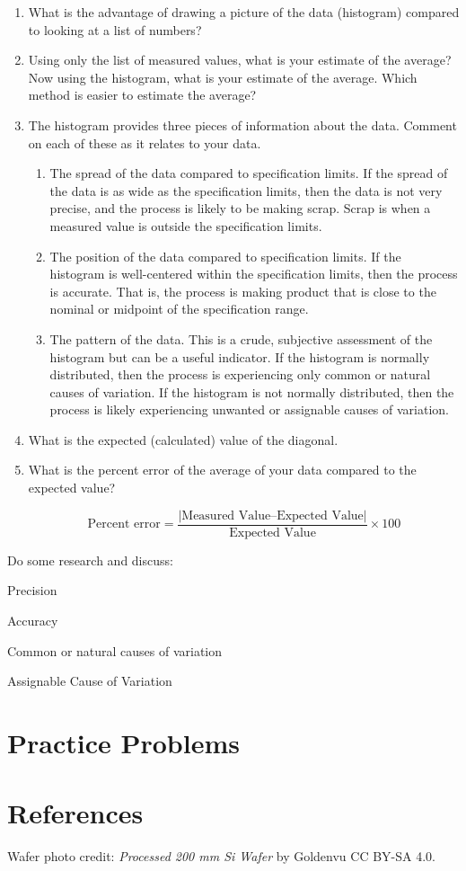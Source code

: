 \documentclass{ximera}
\begin{document}
\begin{enumerate}
\item What is the advantage of drawing a picture of the data (histogram) compared to looking at a list of numbers?
\item Using only the list of measured values, what is your estimate of the average? Now using the histogram, what is your estimate of the average. Which method is easier to estimate the average? 
\item The histogram provides three pieces of information about the data. Comment on each of these as it relates to your data.
    \begin{enumerate}
\item The spread of the data compared to specification limits.  If the spread of the data is as wide as the specification limits, then the data is not very precise, and the process is likely to be making scrap. Scrap is when a measured value is outside the specification limits.
\item The position of the data compared to specification limits. If the histogram is well-centered within the specification limits, then the process is accurate. That is, the process is making product that is close to the nominal or midpoint of the specification range.
\item The pattern of the data. This is a crude, subjective assessment of the histogram but can be a useful indicator.  If the histogram is normally distributed, then the process is experiencing only common or natural causes of variation. If the histogram is not normally distributed, then the process is likely experiencing unwanted or assignable causes of variation.
    \end{enumerate}
\item What is the expected (calculated) value of the diagonal.
\item What is the percent error of the average of your data compared to the expected value?  

$$\text{Percent error} = \frac{|\text{Measured Value} – \text{Expected Value}|}{\text{Expected Value}} \times 100$$
\end{enumerate}
Do some research and discuss: 

Precision

Accuracy

Common or natural causes of variation

Assignable Cause of Variation    



\section*{Practice Problems}

\section*{References}
Wafer photo credit: \textit{Processed 200 mm Si Wafer} by Goldenvu CC BY-SA 4.0.
\end{document}

